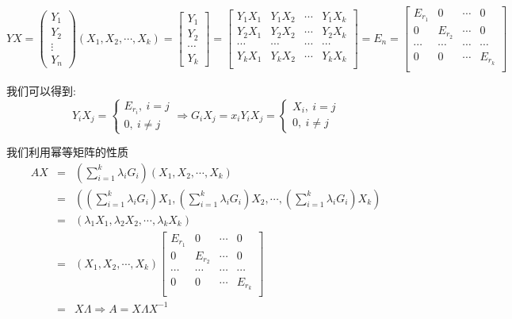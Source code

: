 \begin{anymark}[证明]
	$$YX=\left( \begin{matrix}
		Y_{1}\\Y_{2}\\\vdots\\Y_{n}
	\end{matrix}\right)(X_{1},X_{2},\cdots,X_{k})=\left[ \begin{matrix}
	Y_{1}\\Y_{2}\\\cdots\\Y_{k}
\end{matrix}\right] =\left[\begin{matrix}
Y_{1}X_{1}&Y_{1}X_{2}&\cdots&Y_{1}X_{k}\\
Y_{2}X_{1}&Y_{2}X_{2}&\cdots&Y_{2}X_{k}\\
\cdots&\cdots&\cdots&\cdots\\
Y_{k}X_{1}&Y_{k}X_{2}&\cdots&Y_{k}X_{k}\\
\end{matrix} \right] =E_{n}=\left[\begin{matrix}
E_{r_{1}}&0&\cdots&0\\
0&E_{r_{2}}&\cdots&0\\
\cdots&\cdots&\cdots&\cdots\\
0&0&\cdots&E_{r_{k}}\\
\end{matrix} \right]$$

我们可以得到:  
$$Y_{i}X_{j}=\left\lbrace
\begin{array}{l}
	E_{r_{i}},\ i=j\\
	0,\ i\neq j
\end{array}
\right. \Rightarrow G_{i}X_{j}=x_{i}Y_{i}X_{j}=\left\lbrace
\begin{array}{l}
	X_{i},\ i=j\\
	0,\ i\neq j
\end{array}
\right. $$

	我们利用幂等矩阵的性质
	\begin{eqnarray*}
		AX&=&(\sum\limits_{i=1}^{k}\lambda_{i}G_{i})(X_{1},X_{2},\cdots,X_{k})\\
		&=&((\sum\limits_{i=1}^{k}\lambda_{i}G_{i})X_{1},(\sum\limits_{i=1}^{k}\lambda_{i}G_{i})X_{2},\cdots,(\sum\limits_{i=1}^{k}\lambda_{i}G_{i})X_{k})\\
		&=&(\lambda_{1}X_{1},\lambda_{2}X_{2},\cdots,\lambda_{k}X_{k})\\
		&=&(X_{1},X_{2},\cdots,X_{k})\left[\begin{matrix}
			E_{r_{1}}&0&\cdots&0\\
			0&E_{r_{2}}&\cdots&0\\
			\cdots&\cdots&\cdots&\cdots\\
			0&0&\cdots&E_{r_{k}}\\
		\end{matrix} \right]\\
	&=&X\Lambda\Rightarrow A=X\Lambda X^{-1} 
	\end{eqnarray*}
	

\end{anymark}
